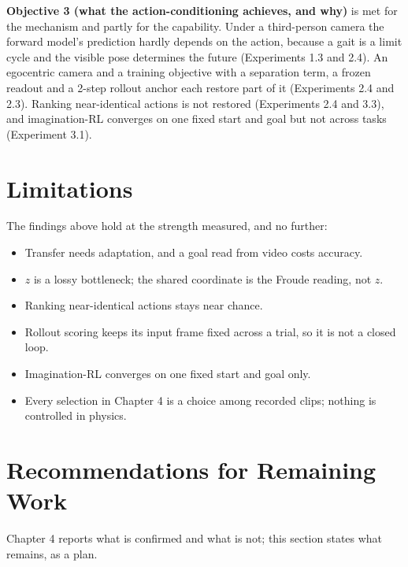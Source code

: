 \documentclass[12pt,a4paper,oneside]{report}
\begin{document}
\noindent\textbf{Objective 3 (what the action-conditioning achieves, and why)} is met for the mechanism and partly for
the capability. Under a third-person camera the forward model's prediction hardly depends on the action, because a gait
is a limit cycle and the visible pose determines the future (Experiments 1.3 and 2.4). An egocentric camera and a
training objective with a separation term, a frozen readout and a 2-step rollout anchor each restore part of it
(Experiments 2.4 and 2.3). Ranking near-identical actions is not restored (Experiments 2.4 and 3.3), and
imagination-RL converges on one fixed start and goal but not across tasks (Experiment 3.1).

\section{Limitations}
The findings above hold at the strength measured, and no further:
\begin{itemize}[label=--]
\item Transfer needs adaptation, and a goal read from video costs accuracy.
\item $z$ is a lossy bottleneck; the shared coordinate is the Froude reading, not $z$.
\item Ranking near-identical actions stays near chance.
\item Rollout scoring keeps its input frame fixed across a trial, so it is not a closed loop.
\item Imagination-RL converges on one fixed start and goal only.
\item Every selection in Chapter 4 is a choice among recorded clips; nothing is controlled in physics.
\end{itemize}

\section{Recommendations for Remaining Work}
Chapter 4 reports what is confirmed and what is not; this section states what remains, as a plan.
\end{document}
